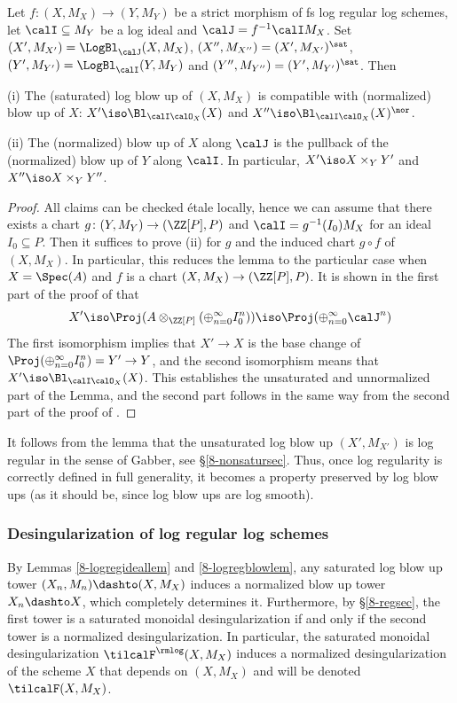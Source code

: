\documentclass[10pt]{../fichiers-configuration-latex/smfart}
\begin{document}
\begin{lemma2}\label{8-logregblowlem} Let
$f{\colon}(X,M_X)\to(Y,M_Y)$ be a strict morphism of fs log
regular log schemes, let $\calI\subseteq M_Y$ be a log ideal and
$\calJ=f^{-1}\calI M_X$. Set $(X',M_{X'})=\LogBl_\calJ(X,M_X)$,
$(X'',M_{X''})=(X',M_{X'})^\sat$, $(Y',M_{Y'})=\LogBl_\calI(Y,M_Y)$
and $(Y'',M_{Y''})=(Y',M_{Y'})^\sat$. Then

(i) The (saturated) log blow up of $(X,M_X)$ is compatible with
(normalized) blow up of $X$: $X'\iso\Bl_{\calI\calO_X}(X)$
and $X''\iso\Bl_{\calI\calO_X}(X)^\nor$.

(ii) The (normalized) blow up of $X$ along $\calJ$ is the pullback
of the (normalized) blow up of $Y$ along $\calI$. In particular,
$X'\iso X\times_YY'$ and $X''\iso X\times_YY''$.  \end{lemma2}
\begin{proof} All claims can be checked \'etale locally, hence we can
assume that there exists a chart $g{\colon}(Y,M_Y)\to(\ZZ[P],P)$
and $\calI=g^{-1}(I_0)M_X$ for an ideal $I_0\subseteq P$. Then it
suffices to prove (ii) for $g$ and the induced chart $g\circ f$ of
$(X,M_X)$. In particular, this reduces the lemma to the particular
case when $X=\Spec(A)$ and $f$ is a chart $(X,M_X)\to(\ZZ[P],P)$. It
is shown in the first part of the proof of \cite[4.3]{Toric@Niziol}
that $$X'\iso\Proj(A\otimes_{\ZZ[P]}(\oplus_{n=0}^\infty
I_0^n))\iso\Proj(\oplus_{n=0}^\infty\calJ^n)$$ The first
isomorphism implies that $X'\to X$ is the base change of
$\Proj(\oplus_{n=0}^\infty I_0^n)=Y'\to Y$, and the second
isomorphism means that $X'\iso\Bl_{\calI\calO_X}(X)$. This
establishes the unsaturated and unnormalized part of the Lemma,
and the second part follows in the same way from the second part
of the proof of \cite[4.3]{Toric@Niziol}.  \end{proof}

\begin{remark2} It follows from the lemma that the unsaturated log
blow up $(X',M_{X'})$ is log regular in the sense of Gabber, see
\S\ref{8-nonsatursec}. Thus, once log regularity is correctly defined
in full generality, it becomes a property preserved by log blow ups
(as it should be, since log blow ups are log smooth).  \end{remark2}

\subsubsection{Desingularization of log regular log
schemes}\label{8-desingloregsec} By Lemmas \ref{8-logregideallem}
and \ref{8-logregblowlem}, any saturated log blow up tower
$(X_n,M_n)\dashto (X,M_X)$ induces a normalized blow up tower
$X_n\dashto X$, which completely determines it. Furthermore,
by \S\ref{8-regsec}, the first tower is a saturated monoidal
desingularization if and only if the second tower is a normalized
desingularization. In particular, the saturated monoidal
desingularization $\tilcalF^\rmlog(X,M_X)$ induces a normalized
desingularization of the scheme $X$ that depends on $(X,M_X)$
and will be denoted $\tilcalF(X,M_X)$.
\end{document}
